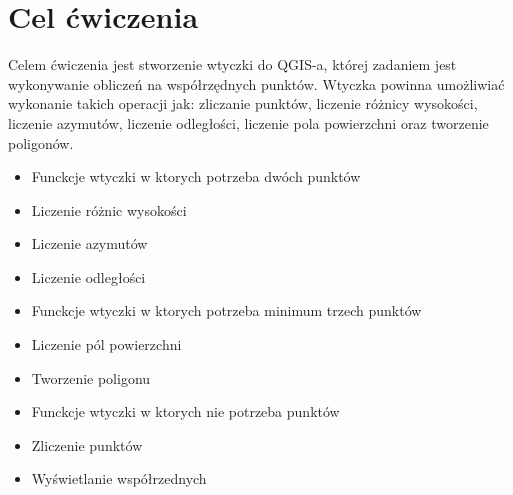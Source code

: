 \section{Cel ćwiczenia}
Celem ćwiczenia jest stworzenie wtyczki do QGIS-a, której zadaniem jest wykonywanie obliczeń na współrzędnych punktów. Wtyczka powinna umożliwiać wykonanie takich operacji jak: zliczanie punktów, liczenie różnicy wysokości, liczenie azymutów, liczenie odległości, liczenie pola powierzchni oraz tworzenie poligonów.

\begin{itemize}
	\item[\filledsquare] Funckcje wtyczki w ktorych potrzeba dwóch punktów
	\item Liczenie różnic wysokości
	\item Liczenie azymutów
	\item Liczenie odległości
	\item [\filledsquare] Funckcje wtyczki w ktorych potrzeba minimum trzech punktów
	\item Liczenie pól powierzchni
	\item Tworzenie poligonu
	\item [\filledsquare] Funckcje wtyczki w ktorych nie potrzeba punktów
	\item Zliczenie punktów
	\item Wyświetlanie współrzednych
	
\end{itemize}
